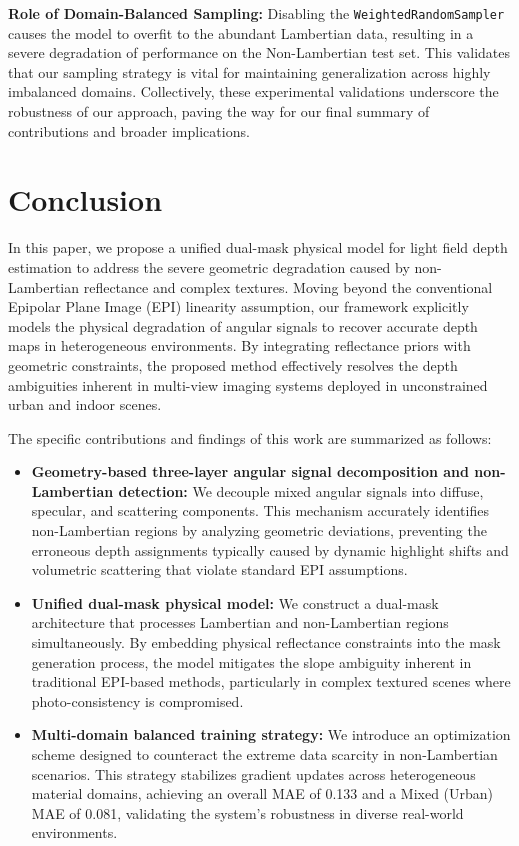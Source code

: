 \documentclass[lettersize,journal]{IEEEtran}
\begin{document}
\textbf{Role of Domain-Balanced Sampling:} 
Disabling the \texttt{WeightedRandomSampler} \cite{ref} causes the model to overfit to the abundant Lambertian data, resulting in a severe degradation of performance on the Non-Lambertian test set. This validates that our sampling strategy is vital for maintaining generalization across highly imbalanced domains. Collectively, these experimental validations underscore the robustness of our approach, paving the way for our final summary of contributions and broader implications.

\section{Conclusion}

In this paper, we propose a unified dual-mask physical model for light field depth estimation to address the severe geometric degradation caused by non-Lambertian reflectance and complex textures. Moving beyond the conventional Epipolar Plane Image (EPI) linearity assumption, our framework explicitly models the physical degradation of angular signals to recover accurate depth maps in heterogeneous environments. By integrating reflectance priors with geometric constraints, the proposed method effectively resolves the depth ambiguities inherent in multi-view imaging systems deployed in unconstrained urban and indoor scenes.

The specific contributions and findings of this work are summarized as follows:
\begin{itemize}
    \item \textbf{Geometry-based three-layer angular signal decomposition and non-Lambertian detection:} We decouple mixed angular signals into diffuse, specular, and scattering components. This mechanism accurately identifies non-Lambertian regions by analyzing geometric deviations, preventing the erroneous depth assignments typically caused by dynamic highlight shifts and volumetric scattering that violate standard EPI assumptions.
    \item \textbf{Unified dual-mask physical model:} We construct a dual-mask architecture that processes Lambertian and non-Lambertian regions simultaneously. By embedding physical reflectance constraints into the mask generation process, the model mitigates the slope ambiguity inherent in traditional EPI-based methods, particularly in complex textured scenes where photo-consistency is compromised.
    \item \textbf{Multi-domain balanced training strategy:} We introduce an optimization scheme designed to counteract the extreme data scarcity in non-Lambertian scenarios. This strategy stabilizes gradient updates across heterogeneous material domains, achieving an overall MAE of 0.133 and a Mixed (Urban) MAE of 0.081, validating the system's robustness in diverse real-world environments.
\end{itemize}
\end{document}
